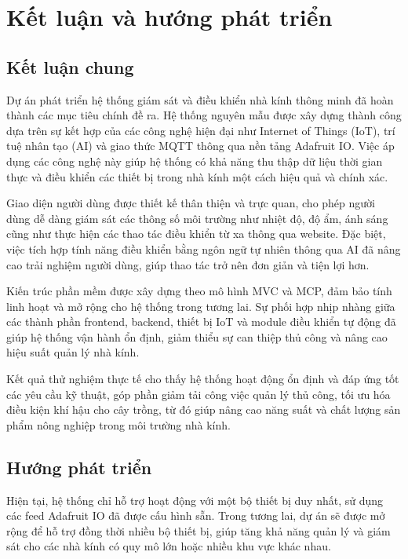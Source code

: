 \section{Kết luận và hướng phát triển}
\subsection{Kết luận chung}

Dự án phát triển hệ thống giám sát và điều khiển nhà kính thông minh đã hoàn thành các mục tiêu chính đề ra. Hệ thống nguyên mẫu được xây dựng thành công dựa trên sự kết hợp của các công nghệ hiện đại như Internet of Things (IoT), trí tuệ nhân tạo (AI) và giao thức MQTT thông qua nền tảng Adafruit IO. Việc áp dụng các công nghệ này giúp hệ thống có khả năng thu thập dữ liệu thời gian thực và điều khiển các thiết bị trong nhà kính một cách hiệu quả và chính xác.

Giao diện người dùng được thiết kế thân thiện và trực quan, cho phép người dùng dễ dàng giám sát các thông số môi trường như nhiệt độ, độ ẩm, ánh sáng cũng như thực hiện các thao tác điều khiển từ xa thông qua website. Đặc biệt, việc tích hợp tính năng điều khiển bằng ngôn ngữ tự nhiên thông qua AI đã nâng cao trải nghiệm người dùng, giúp thao tác trở nên đơn giản và tiện lợi hơn.

Kiến trúc phần mềm được xây dựng theo mô hình MVC và MCP, đảm bảo tính linh hoạt và mở rộng cho hệ thống trong tương lai. Sự phối hợp nhịp nhàng giữa các thành phần frontend, backend, thiết bị IoT và module điều khiển tự động đã giúp hệ thống vận hành ổn định, giảm thiểu sự can thiệp thủ công và nâng cao hiệu suất quản lý nhà kính.

Kết quả thử nghiệm thực tế cho thấy hệ thống hoạt động ổn định và đáp ứng tốt các yêu cầu kỹ thuật, góp phần giảm tải công việc quản lý thủ công, tối ưu hóa điều kiện khí hậu cho cây trồng, từ đó giúp nâng cao năng suất và chất lượng sản phẩm nông nghiệp trong môi trường nhà kính.

\subsection{Hướng phát triển}

Hiện tại, hệ thống chỉ hỗ trợ hoạt động với một bộ thiết bị duy nhất, sử dụng các feed Adafruit IO đã được cấu hình sẵn. Trong tương lai, dự án sẽ được mở rộng để hỗ trợ đồng thời nhiều bộ thiết bị, giúp tăng khả năng quản lý và giám sát cho các nhà kính có quy mô lớn hoặc nhiều khu vực khác nhau.

